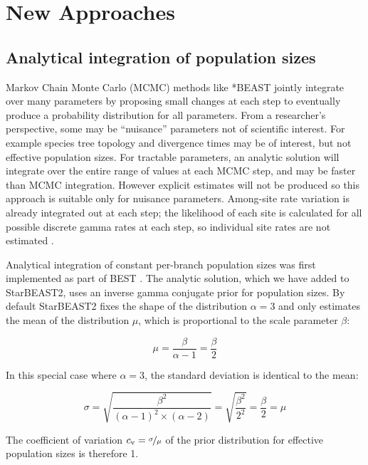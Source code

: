 \documentclass[12pt]{article}
\begin{document}
\section{New Approaches}

\subsection{Analytical integration of population sizes}

Markov Chain Monte Carlo (MCMC) methods like *BEAST jointly integrate
over many parameters by proposing small changes at each step to eventually
produce a probability distribution for all parameters. From a
researcher's perspective, some may be ``nuisance'' parameters not of scientific
interest. For example species tree topology and divergence times may be of
interest, but not effective population sizes. For tractable parameters, an
analytic solution will integrate over the entire range of values at each MCMC
step, and may be faster than MCMC integration. However explicit
estimates will not be produced so this approach is suitable only for nuisance
parameters. Among-site rate variation is already integrated out at each step;
the likelihood of each site is calculated for all possible discrete gamma rates
at each step, so individual site rates are not estimated \citep{Yang1994}.

Analytical integration of constant per-branch population sizes was first
implemented as part of BEST \citep{EVO:EVO414}. The analytic solution, which we
have added to StarBEAST2, uses an inverse gamma conjugate prior for population
sizes. By default StarBEAST2 fixes the shape of the distribution $\alpha = 3$
and only estimates the mean of the distribution $\mu$, which is proportional to the
scale parameter $\beta$:

\begin{equation}
\mu = \frac{\beta}{\alpha - 1} = \frac{\beta}{2}
\end{equation}

In this special case where $\alpha = 3$, the standard deviation is identical to
the mean:

\begin{equation}
\sigma = \sqrt{\frac{\beta^2}{(\alpha - 1)^2 \times (\alpha - 2)}} = \sqrt{\frac{\beta^2}{2^2}} = \frac{\beta}{2} = \mu
\end{equation}

The coefficient of variation $c_\mathrm{v} = \nicefrac{\sigma}{\mu}$ of the
prior distribution for effective population sizes is therefore 1.
\end{document}
